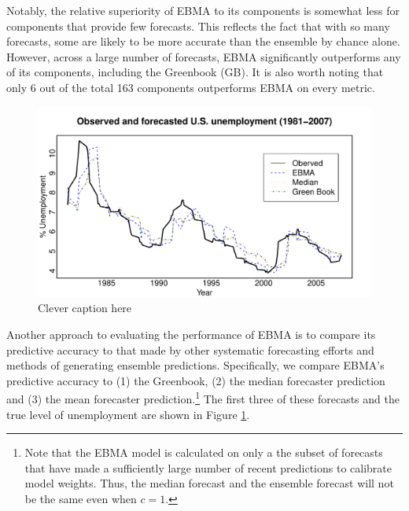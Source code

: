 \documentclass[12pt,fullpage,endnotes]{article}
\begin{document}
Notably, the relative superiority of EBMA to its components is
somewhat less for components that provide few forecasts.  This
reflects the fact that with so many forecasts, some are likely to be
more accurate than the ensemble by chance alone. However, across a
large number of forecasts, EBMA significantly outperforms any of its
components, including the Greenbook (GB).  It is also worth noting
that only 6 out of the total 163 components outperforms EBMA on every
metric.

\begin{figure}[h]
\caption{Clever caption here}
\label{timeSeries}
\begin{center}
\includegraphics[scale=.8]{timeSeries}
\end{center}
\end{figure}


Another approach to evaluating the performance of EBMA is to compare
its predictive accuracy to that made by other systematic forecasting
efforts and methods of generating ensemble predictions.  Specifically,
we compare EBMA's predictive accuracy to (1) the Greenbook, (2) the
median forecaster prediction and (3) the mean forecaster
prediction.\footnote{Note that the EBMA model is calculated on only a the
  subset of forecasts that have made a sufficiently large number of
  recent predictions to calibrate model weights.  Thus, the median
  forecast and the ensemble forecast will not be the same even when
  $c=1$.  }  The first three of these forecasts and the true level of
unemployment are shown in Figure \ref{timeSeries}.
\end{document}
